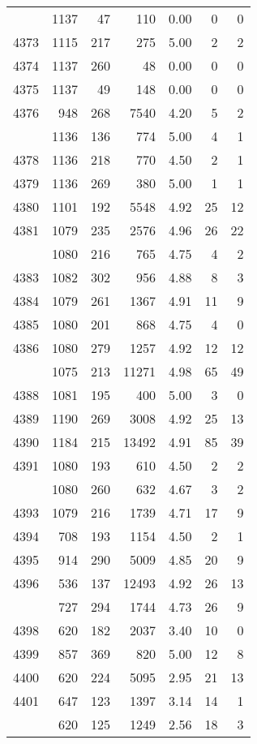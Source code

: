 \documentclass[
]{article}
\begin{document}
\begin{table}
\begin{tabular}[t]{lrrrrrr}
\addlinespace
4372 & 1137 & 47 & 110 & 0.00 & 0 & 0\\
4373 & 1115 & 217 & 275 & 5.00 & 2 & 2\\
4374 & 1137 & 260 & 48 & 0.00 & 0 & 0\\
4375 & 1137 & 49 & 148 & 0.00 & 0 & 0\\
4376 & 948 & 268 & 7540 & 4.20 & 5 & 2\\
\addlinespace
4377 & 1136 & 136 & 774 & 5.00 & 4 & 1\\
4378 & 1136 & 218 & 770 & 4.50 & 2 & 1\\
4379 & 1136 & 269 & 380 & 5.00 & 1 & 1\\
4380 & 1101 & 192 & 5548 & 4.92 & 25 & 12\\
4381 & 1079 & 235 & 2576 & 4.96 & 26 & 22\\
\addlinespace
4382 & 1080 & 216 & 765 & 4.75 & 4 & 2\\
4383 & 1082 & 302 & 956 & 4.88 & 8 & 3\\
4384 & 1079 & 261 & 1367 & 4.91 & 11 & 9\\
4385 & 1080 & 201 & 868 & 4.75 & 4 & 0\\
4386 & 1080 & 279 & 1257 & 4.92 & 12 & 12\\
\addlinespace
4387 & 1075 & 213 & 11271 & 4.98 & 65 & 49\\
4388 & 1081 & 195 & 400 & 5.00 & 3 & 0\\
4389 & 1190 & 269 & 3008 & 4.92 & 25 & 13\\
4390 & 1184 & 215 & 13492 & 4.91 & 85 & 39\\
4391 & 1080 & 193 & 610 & 4.50 & 2 & 2\\
\addlinespace
4392 & 1080 & 260 & 632 & 4.67 & 3 & 2\\
4393 & 1079 & 216 & 1739 & 4.71 & 17 & 9\\
4394 & 708 & 193 & 1154 & 4.50 & 2 & 1\\
4395 & 914 & 290 & 5009 & 4.85 & 20 & 9\\
4396 & 536 & 137 & 12493 & 4.92 & 26 & 13\\
\addlinespace
4397 & 727 & 294 & 1744 & 4.73 & 26 & 9\\
4398 & 620 & 182 & 2037 & 3.40 & 10 & 0\\
4399 & 857 & 369 & 820 & 5.00 & 12 & 8\\
4400 & 620 & 224 & 5095 & 2.95 & 21 & 13\\
4401 & 647 & 123 & 1397 & 3.14 & 14 & 1\\
\addlinespace
4402 & 620 & 125 & 1249 & 2.56 & 18 & 3\\

\end{tabular}
\end{table}
\end{document}
